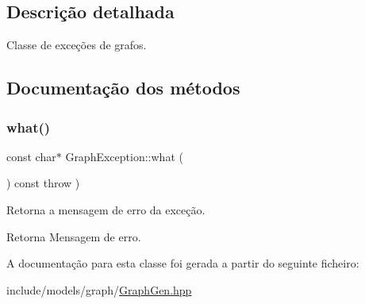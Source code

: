 \subsection{Descrição detalhada}
Classe de exceções de grafos. 

\subsection{Documentação dos métodos}
\mbox{\label{classGraphException_ad4368b8af89252086b225cedcfc38639}} 
\subsubsection{\texorpdfstring{what()}{what()}}
{\footnotesize\ttfamily const char$\ast$ Graph\+Exception\+::what (\begin{DoxyParamCaption}{ }\end{DoxyParamCaption}) const throw  ) \hspace{0.3cm}{\ttfamily [inline]}}

Retorna a mensagem de erro da exceção. \begin{DoxyReturn}{Retorna}
Mensagem de erro. 
\end{DoxyReturn}


A documentação para esta classe foi gerada a partir do seguinte ficheiro\+:\begin{DoxyCompactItemize}
\item 
include/models/graph/\hyperlink{GraphGen_8hpp}{Graph\+Gen.\+hpp}\end{DoxyCompactItemize}
